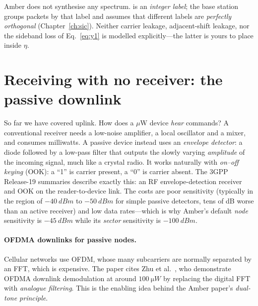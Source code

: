\begin{reality}
Amber does not synthesise any spectrum.  is an
\emph{integer label}; the base station groups packets by that label and
assumes that different labels are \emph{perfectly orthogonal}
(Chapter~\ref{ch:sic}). Neither carrier leakage, adjacent-shift leakage, nor the
sideband loss of Eq.~\eqref{eq:y1} is modelled explicitly---the latter is yours to place
inside $\eta$.
\end{reality}

\section{Receiving with no receiver: the passive downlink}
\label{sec:passivedl}

So far we have covered uplink. How does a $\mu$W device \emph{hear} commands?
A conventional receiver needs a low-noise amplifier, a local oscillator and a
mixer, and consumes milliwatts. A passive device instead uses an
\emph{envelope detector}: a diode followed by a low-pass filter that outputs
the slowly varying \emph{amplitude} of the incoming signal, much like a crystal
radio. It works naturally with \emph{on--off keying} (OOK): a ``1'' is
carrier present, a ``0'' is carrier absent. The 3GPP Release-19 summaries
describe exactly this: an RF envelope-detection receiver and OOK on the
reader-to-device link. The costs are poor sensitivity (typically in the region of
$\SI{-40}{dBm}$ to $\SI{-50}{dBm}$ for simple passive detectors, tens of dB
worse than an active receiver) and low data rates---which is why Amber's default
\emph{node} sensitivity is $\SI{-45}{dBm}$ while its \emph{sector} sensitivity
is $\SI{-100}{dBm}$.

\paragraph{OFDMA downlinks for passive nodes.}
Cellular networks use OFDM, whose many subcarriers are normally separated by
an FFT, which is expensive. The paper cites Zhu et al.\
\citep{zhu2022ofdma}, who demonstrate OFDMA downlink demodulation at around
$\SI{100}{\micro W}$ by replacing the digital FFT with \emph{analogue
filtering}. This is the enabling idea behind the Amber paper's \emph{dual-tone
principle}.

